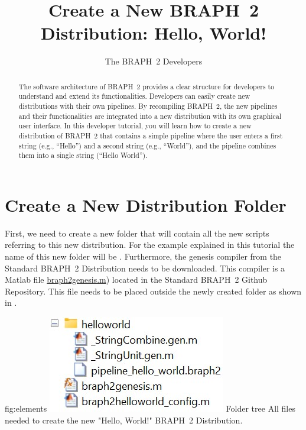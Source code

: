 \documentclass{tufte-handout}
\title{Create a New BRAPH~2 Distribution: Hello, World! }
\author[The BRAPH~2 Developers]{The BRAPH~2 Developers}
\begin{document}
\maketitle

\begin{abstract}
\noindent
The software architecture of BRAPH~2 provides a clear structure for developers to understand and extend its functionalities. 
Developers can easily create new distributions with their own pipelines. 
By recompiling BRAPH~2, the new pipelines and their functionalities are integrated into a new distribution with its own graphical user interface.
In this developer tutorial, you will learn how to create a new distribution of BRAPH~2 that contains a simple pipeline where the user enters a first string (e.g., “Hello”) and a second string (e.g., “World”), and the pipeline combines them into a single string (“Hello World”).
\end{abstract}

\tableofcontents

\clearpage
\section{Create a New Distribution Folder}

First, we need to create a new folder that will contain all the new scripts referring to this new distribution. For the example explained in this tutorial the name of this new folder will be . Furthermore, the genesis compiler from the Standard BRAPH~2 Distribution needs to be downloaded. This compiler is a Matlab file \href{https://github.com/braph-software/BRAPH-2/tree/develop/braph2genesis/braph2genesis.m}{braph2genesis.m})  located in the Standard BRAPH~2 Github Repository. This file needs to be placed outside the newly created folder  as shown in .

	{fig:elements}
	{\includegraphics{fig01.jpg}}
	{Folder tree}
	{
		All files needed to create the new "Hello, World!" BRAPH~2 Distribution.
	}
\end{document}
